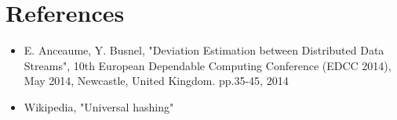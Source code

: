 \documentclass[a4paper]{article}%
\begin{document}
\section*{References}

\begin{itemize}
	\item \scriptsize E. Anceaume, Y. Busnel, "Deviation Estimation between Distributed Data Streams", 10th European Dependable Computing Conference (EDCC 2014), May 2014, Newcastle, United Kingdom. pp.35-45, 2014
	\item \scriptsize Wikipedia, "Universal hashing"
\end{itemize}


\clearpage
\end{document}
